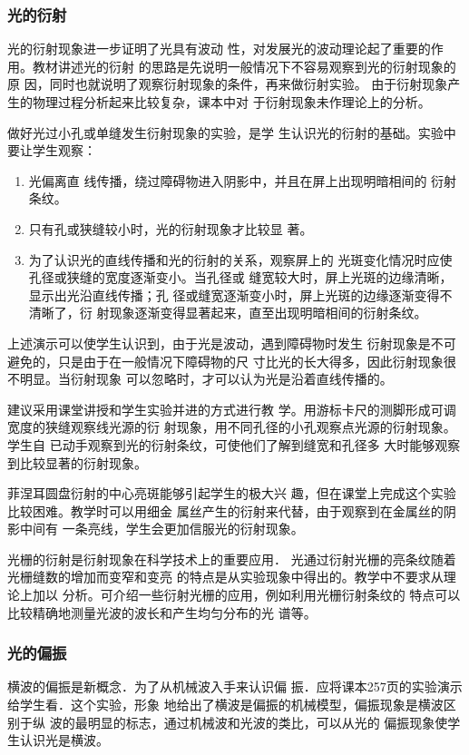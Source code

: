 \subsubsection{光的衍射}

光的衍射现象进一步证明了光具有波动
性，对发展光的波动理论起了重要的作用。教材讲述光的衍射
的思路是先说明一般情况下不容易观察到光的衍射现象的原
因，同时也就说明了观察衍射现象的条件，再来做衍射实验。
由于衍射现象产生的物理过程分析起来比较复杂，课本中对
于衍射现象未作理论上的分析。

做好光过小孔或单缝发生衍射现象的实验，是学
生认识光的衍射的基础。实验中要让学生观察：
\begin{enumerate}
\item 光偏离直
线传播，绕过障碍物进入阴影中，并且在屏上出现明暗相间的
衍射条纹。
\item 只有孔或狭缝较小时，光的衍射现象才比较显
著。
\item 为了认识光的直线传播和光的衍射的关系，观察屏上的
光斑变化情况时应使孔径或狭缝的宽度逐渐变小。当孔径或
缝宽较大时，屏上光斑的边缘清晰，显示出光沿直线传播；孔
径或缝宽逐渐变小时，屏上光斑的边缘逐渐变得不清晰了，衍
射现象逐渐变得显著起来，直至出现明暗相间的衍射条纹。
\end{enumerate}
上述演示可以使学生认识到，由于光是波动，遇到障碍物时发生
衍射现象是不可避免的，只是由于在一般情况下障碍物的尺
寸比光的长大得多，因此衍射现象很不明显。当衍射现象
可以忽略时，才可以认为光是沿着直线传播的。

建议采用课堂讲授和学生实验并进的方式进行教
学。用游标卡尺的测脚形成可调宽度的狭缝观察线光源的衍
射现象，用不同孔径的小孔观察点光源的衍射现象。学生自
已动手观察到光的衍射条纹，可使他们了解到缝宽和孔径多
大时能够观察到比较显著的衍射现象。

菲涅耳圆盘衍射的中心亮斑能够引起学生的极大兴
趣，但在课堂上完成这个实验比较困难。教学时可以用细金
属丝产生的衍射来代替，由于观察到在金属丝的阴影中间有
一条亮线，学生会更加信服光的衍射现象。

光栅的衍射是衍射现象在科学技术上的重要应用．
光通过衍射光栅的亮条纹随着光栅缝数的增加而变窄和变亮
的特点是从实验现象中得出的。教学中不要求从理论上加以
分析。可介绍一些衍射光栅的应用，例如利用光栅衍射条纹的
特点可以比较精确地测量光波的波长和产生均匀分布的光
谱等。

\subsubsection{光的偏振}
横波的偏振是新概念．为了从机械波入手来认识偏
振．应将课本257页的实验演示给学生看．这个实验，形象
地给出了横波是偏振的机械模型，偏振现象是横波区别于纵
波的最明显的标志，通过机械波和光波的类比，可以从光的
偏振现象使学生认识光是横波。

